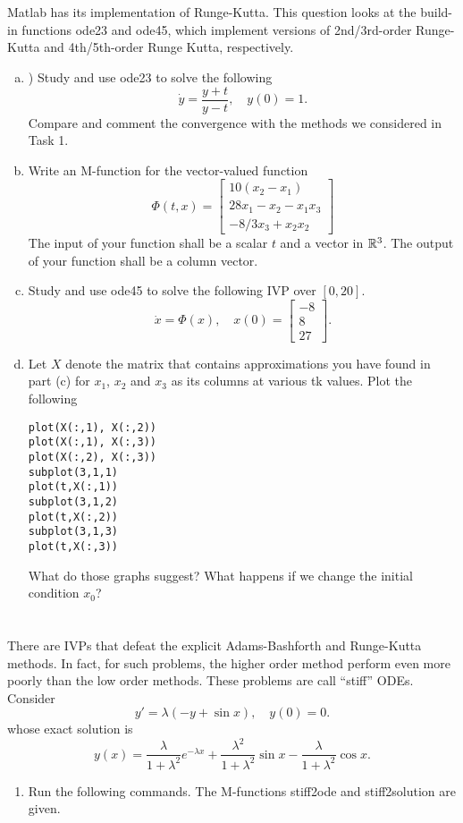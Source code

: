 \section{}
Matlab has its implementation of Runge-Kutta.
This question looks at the build-in functions {\color{blue}ode23} and {\color{blue}ode45}, which implement versions of 2nd/3rd-order Runge-Kutta and 4th/5th-order Runge Kutta, respectively.
\begin{enumerate}[(a)]
	\item ) Study and use {\color{blue}ode23} to solve the following
	\[ \dot{y}=\frac{y+t}{y-t}, \quad y(0)=1. \]
	Compare and comment the convergence with the methods we considered in Task 1.
	\item Write an M-function for the vector-valued function
	\[ \Phi(t,x)=\begin{bmatrix} 10(x_2-x_1) \\ 28x_1-x_2-x_1x_3 \\ -8/3x_3+x_2x_2 \end{bmatrix} \]
	The input of your function shall be a scalar \(t\) and a vector in \(\mathbb{R}^3\).
	The output of your function shall be a column vector.
	\item  Study and use {\color{blue}ode45} to solve the following IVP over \([0, 20]\).
	\[ \dot{x}=\Phi(x), \quad x(0)=\begin{bmatrix} -8 \\ 8 \\ 27 \end{bmatrix}. \]
	\item Let \(X\) denote the matrix that contains approximations you have found in part (c) for \(x_1\), \(x_2\) and \(x_3\) as its columns at various tk values.
	Plot the following
	\begin{lstlisting}[style=Matlab-editor]
plot(X(:,1), X(:,2))
plot(X(:,1), X(:,3))
plot(X(:,2), X(:,3))
subplot(3,1,1)
plot(t,X(:,1))
subplot(3,1,2)
plot(t,X(:,2))
subplot(3,1,3)
plot(t,X(:,3))
	\end{lstlisting}
	What do those graphs suggest?
	What happens if we change the initial condition \(x_0\)?
\end{enumerate}


\section{}
There are IVPs that defeat the explicit Adams-Bashforth and Runge-Kutta methods.
In fact, for such problems, the higher order method perform even more poorly than the low
order methods.
These problems are call ``stiff'' ODEs.
Consider
\[ y' = \lambda(-y+\sin x),\quad y(0) = 0. \]
whose exact solution is
\[ y(x)=\frac{\lambda}{1+\lambda^2}e^{-\lambda x}+\frac{\lambda^2}{1+\lambda^2}\sin x-\frac{\lambda}{1+\lambda^2}\cos x. \]
\begin{enumerate}
	\item Run the following commands.
	The M-functions stiff2ode and stiff2solution are given.
\end{enumerate}